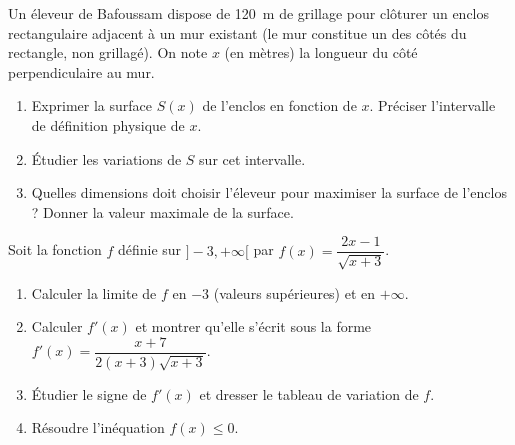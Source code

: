 \documentclass[11pt]{article}
\begin{document}
\begin{exercice}
Un éleveur de Bafoussam dispose de \SI{120}{\meter} de grillage pour clôturer un enclos rectangulaire adjacent à un mur existant (le mur constitue un des côtés du rectangle, non grillagé). On note $x$ (en mètres) la longueur du côté perpendiculaire au mur.
\begin{enumerate}
    \item Exprimer la surface $S(x)$ de l'enclos en fonction de $x$. Préciser l'intervalle de définition physique de $x$.
    \item Étudier les variations de $S$ sur cet intervalle.
    \item Quelles dimensions doit choisir l'éleveur pour maximiser la surface de l'enclos ? Donner la valeur maximale de la surface.
\end{enumerate}
\end{exercice}

\begin{exercice}
Soit la fonction $f$ définie sur $]-3, +\infty[$ par $f(x) = \dfrac{2x - 1}{\sqrt{x + 3}}$.
\begin{enumerate}
    \item Calculer la limite de $f$ en $-3$ (valeurs supérieures) et en $+\infty$.
    \item Calculer $f'(x)$ et montrer qu'elle s'écrit sous la forme $f'(x) = \dfrac{x + 7}{2(x+3)\sqrt{x+3}}$.
    \item Étudier le signe de $f'(x)$ et dresser le tableau de variation de $f$.
    \item Résoudre l'inéquation $f(x) \leqslant 0$.
\end{enumerate}
\end{exercice}
\end{document}
